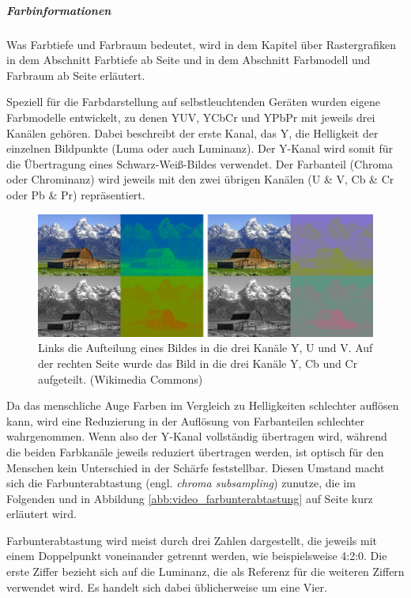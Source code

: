 \subparagraph{Farbinformationen} Was Farbtiefe und Farbraum bedeutet, wird in dem Kapitel über Rastergrafiken in dem Abschnitt Farbtiefe ab Seite \pageref{RG_Farbtiefe} und in dem Abschnitt Farbmodell und Farbraum ab Seite \pageref{RG_Farbmodell} erläutert. 

Speziell für die Farbdarstellung auf selbstleuchtenden Geräten wurden eigene Farbmodelle entwickelt, zu denen YUV, YCbCr und YPbPr mit jeweils drei Kanälen gehören. Dabei beschreibt der erste Kanal, das Y, die Helligkeit der einzelnen Bildpunkte (Luma oder auch Luminanz). Der Y-Kanal wird somit für die Übertragung eines Schwarz-Weiß-Bildes verwendet. Der Farbanteil (Chroma oder Chrominanz) wird jeweils mit den zwei übrigen Kanälen (U \& V, Cb \& Cr oder Pb \& Pr) repräsentiert.

\begin{figure}[h!tb]
\centering
  \includegraphics[width=\linewidth]{bilder/video_YUV-YCbCr}
\caption{Links die Aufteilung eines Bildes in die drei Kanäle Y, U und V. Auf der rechten Seite wurde das Bild in die drei Kanäle Y, Cb und Cr aufgeteilt. (Wikimedia Commons)}
\end{figure}

Da das menschliche Auge Farben im Vergleich zu Helligkeiten schlechter auflösen kann, wird eine Reduzierung in der Auflösung von Farbanteilen schlechter wahrgenommen. Wenn also der Y-Kanal vollständig übertragen wird, während die beiden Farbkanäle jeweils reduziert übertragen werden, ist optisch für den Menschen kein Unterschied in der Schärfe feststellbar. Diesen Umstand macht sich die Farbunterabtastung (engl. \emph{chroma subsampling}) zunutze, die im Folgenden und in Abbildung \ref{abb:video_farbunterabtastung} auf Seite \pageref{abb:video_farbunterabtastung} kurz erläutert wird.

Farbunterabtastung wird meist durch drei Zahlen dargestellt, die jeweils mit einem Doppelpunkt voneinander getrennt werden, wie beispielsweise 4:2:0. Die erste Ziffer bezieht sich auf die Luminanz, die als Referenz für die weiteren Ziffern verwendet wird. Es handelt sich dabei üblicherweise um eine Vier. 

